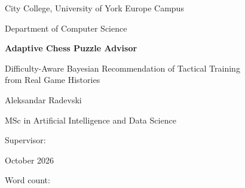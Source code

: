 \begin{titlepage}
\centering
\vspace*{15mm}
{\large City College, University of York Europe Campus\par}
{\large Department of Computer Science\par}
\vspace{25mm}
{\Huge\bfseries Adaptive Chess Puzzle Advisor\par}
\vspace{6mm}
{\Large Difficulty-Aware Bayesian Recommendation of Tactical Training\\ from Real Game Histories\par}
\vspace{25mm}
{\Large Aleksandar Radevski\par}
\vspace{6mm}
{\large MSc in Artificial Intelligence and Data Science\par}
\vspace{20mm}
{\large Supervisor: \par}
\vfill
{\large October 2026\par}
\vspace{4mm}
{\small Word count: \par}
\end{titlepage}
